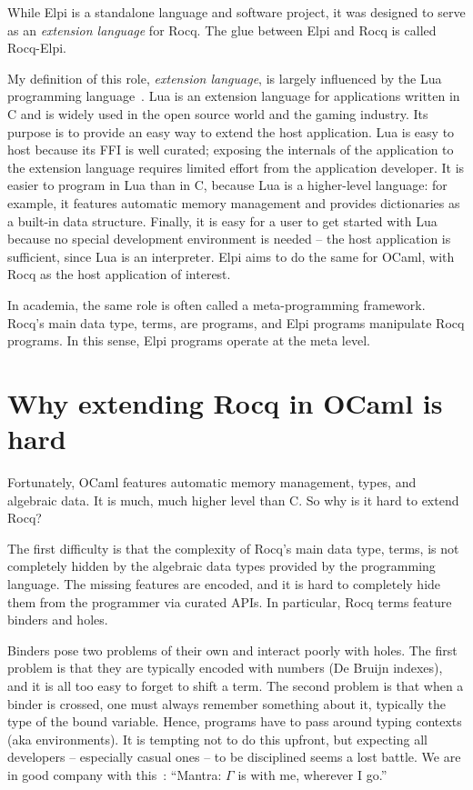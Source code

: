 \documentclass[a4paper, 11pt]{book}
\begin{document}
While Elpi is a standalone language and software project, it was designed to
serve as an \emph{extension language} for Rocq. The glue between Elpi and Rocq
is called Rocq-Elpi.

My definition of this role, \emph{extension language}, is largely influenced by
the Lua programming language~\cite{10.5555/1200583}. Lua is an extension
language for applications written in C and is widely used in the open source
world and the gaming industry. Its purpose is to provide an easy way to extend
the host application. Lua is easy to host because its FFI is well curated;
exposing the internals of the application to the extension language requires
limited effort from the application developer. It is easier to program in Lua
than in C, because Lua is a higher-level language: for example, it features
automatic memory management and provides dictionaries as a built-in data
structure. Finally, it is easy for a user to get started with Lua because no
special development environment is needed -- the host application is sufficient,
since Lua is an interpreter.
Elpi aims to do the same for OCaml, with Rocq as the host application of
interest.

In academia, the same role is often called a meta-programming framework. Rocq's
main data type, terms, are programs, and Elpi programs manipulate Rocq
programs. In this sense, Elpi programs operate at the meta level.


\section{Why extending Rocq in OCaml is hard}

Fortunately, OCaml features automatic memory management, types, and algebraic
data. It is much, much higher level than C. So why is it hard to extend Rocq?

The first difficulty is that the complexity of Rocq's main data type, terms,
is not completely hidden by the algebraic data types provided by the
programming language. The missing features are encoded, and it is hard to
completely hide them from the programmer via curated APIs. In particular,
Rocq terms feature binders and holes.

Binders pose two problems of their own and interact poorly with holes. The
first problem is that they are typically encoded with numbers (De Bruijn
indexes), and it is all too easy to forget to shift a term. The second
problem is that when a binder is crossed, one must always remember something
about it, typically the type of the bound variable. Hence, programs have to
pass around typing contexts (aka environments). It is tempting not to do this
upfront, but expecting all developers -- especially casual ones -- to be disciplined
seems a lost battle. We are in good company with this~\cite[page 20]{mcbride}:
``Mantra: $\Gamma$ is with me, wherever I go.''
\end{document}
